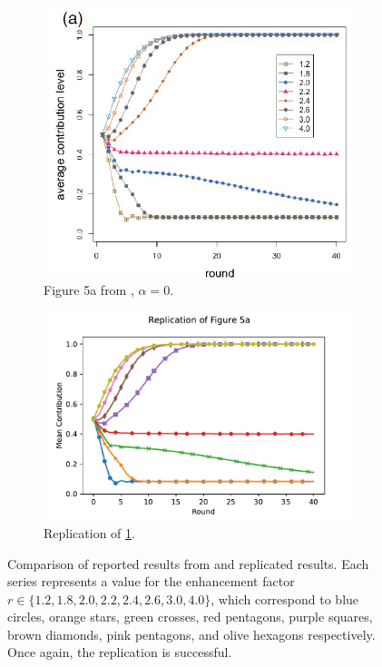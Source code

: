 \FloatBarrier
\begin{figure}[!h] 
  \begin{subfigure}[b]{0.45\textwidth}
    \includegraphics[width=\textwidth]{images/TAfig4a_real.png}
    \caption{Figure 5a from \cite{RN49}, $\alpha = 0$. }
    \label{TAfig4a_real}
  \end{subfigure}
  \hfill
  \begin{subfigure}[b]{0.45\textwidth}
    \includegraphics[width=1.35\textwidth]{images/final_TAfig5a.pdf}
    \caption{Replication of \ref{TAfig4a_real}. }
    \label{TAfig4a}
  \end{subfigure}
  \caption{Comparison of reported results from \cite{RN49} and replicated results. Each series represents a value for the enhancement factor $r \in \{1.2, 1.8, 2.0, 2.2, 2.4, 2.6, 3.0, 4.0\}$, which correspond to blue circles, orange stars, green crosses, red pentagons, purple squares, brown diamonds, pink pentagons, and olive hexagons respectively. Once again, the replication is successful. } \label{comp1}
\end{figure} 
\FloatBarrier




